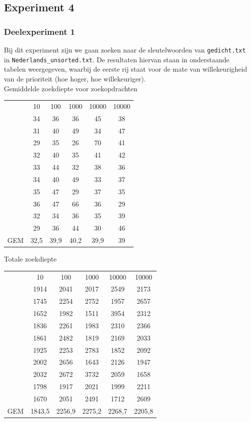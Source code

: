 \documentclass[a4paper,10pt]{article}
\begin{document}
\subsection{Experiment 4}
\subsubsection{Deelexperiment 1}
Bij dit experiment zijn we gaan zoeken naar de sleutelwoorden van \texttt{gedicht.txt} in \texttt{Nederlands\_unsorted.txt}. De resultaten hiervan staan in onderstaande tabelen weergegeven, waarbij de eerste rij staat voor de mate van willekeurigheid van de prioriteit (hoe hoger, hoe willekeuriger). \\

Gemiddelde zoekdiepte voor zoekopdrachten \\
\begin{center}
\begin{tabular}{c c c c c c}
 & 10 & 100 & 1000 & 10000 & 10000 \\
 & 34 & 36 & 36 & 45 & 38 \\
 & 31 & 40 & 49 & 34 & 47 \\
 & 29 & 	35 & 26 & 70 & 41 \\
 & 32 & 	40 & 35 & 41 & 42 \\
 & 33 & 	44 & 32 & 38 & 36 \\
 & 34 & 	40 & 49 & 33 & 37 \\
 & 35 & 	47 & 29 & 37 & 35 \\
 & 36 & 	47 & 66 & 36 & 29 \\
 & 32 & 	34 & 36 & 35 & 39 \\
 & 29 & 	36 & 44 & 30 & 46 \\
GEM & 32,5 & 39,9 & 40,2 & 39,9 & 39 \\
\end{tabular}
\end{center}

Totale zoekdiepte\\
\begin{center}
\begin{tabular}{c c c c c c}
 & 10 & 100 & 1000 & 10000 & 10000 \\
 & 1914 & 2041 & 2017 & 2549 & 2173 \\
 & 1745 & 2254 & 2752 & 1957 & 2657 \\
 & 1652 & 1982 & 1511 & 3954 & 2312 \\
 & 1836 & 2261 & 1983 & 2310 & 2366 \\
 & 1861 & 2482 & 1819 & 2169 & 2033 \\
 & 1925 & 2253 & 2783 & 1852 & 2092 \\
 & 2002 & 2656 & 1643 & 2126 & 1947 \\
 & 2032 & 2672 & 3732 & 2059 & 1658 \\
 & 1798 & 1917 & 2021 & 1999 & 2211 \\
 & 1670 & 2051 & 2491 & 1712 & 2609 \\
GEM & 1843,5 & 2256,9 & 2275,2 & 2268,7 & 2205,8 \\
\end{tabular}
\end{center}
\end{document}
